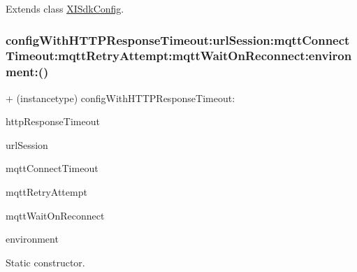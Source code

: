 Extends class \hyperlink{class_x_i_sdk_config_afa1234314350e4363b3540809540812b}{X\+I\+Sdk\+Config}.

\hypertarget{category_x_i_sdk_config_07_selector_08_a01ace5ad13ef869398e87b9413dab6e3}{}\label{category_x_i_sdk_config_07_selector_08_a01ace5ad13ef869398e87b9413dab6e3} 
\subsubsection{\texorpdfstring{config\+With\+H\+T\+T\+P\+Response\+Timeout\+:url\+Session\+:mqtt\+Connect\+Timeout\+:mqtt\+Retry\+Attempt\+:mqtt\+Wait\+On\+Reconnect\+:environment\+:()}{configWithHTTPResponseTimeout:urlSession:mqttConnectTimeout:mqttRetryAttempt:mqttWaitOnReconnect:environment:()}}
{\footnotesize\ttfamily + (instancetype) config\+With\+H\+T\+T\+P\+Response\+Timeout\+: \begin{DoxyParamCaption}\item[{(long)}]{http\+Response\+Timeout }\item[{urlSession:(N\+S\+U\+R\+L\+Session $\ast$)}]{url\+Session }\item[{mqttConnectTimeout:(long)}]{mqtt\+Connect\+Timeout }\item[{mqttRetryAttempt:(int)}]{mqtt\+Retry\+Attempt }\item[{mqttWaitOnReconnect:(long)}]{mqtt\+Wait\+On\+Reconnect }\item[{environment:(X\+I\+Environment)}]{environment }\end{DoxyParamCaption}}



Static constructor. 



